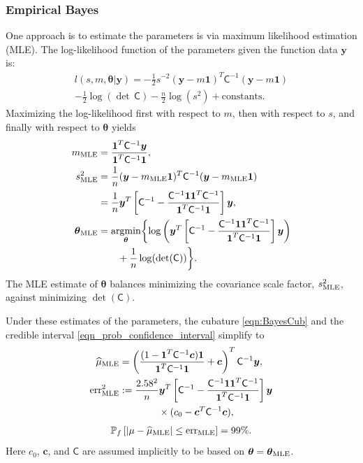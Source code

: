 \documentclass[twocolumn]{svjour3}          %
\newcommand{\bm}[1]{\boldsymbol{#1}}
\newcommand{\vtheta}{{\bm{\theta}}}
\newcommand{\vc}{\bm{c}}
\newcommand{\vy}{\bm{y}}
\newcommand{\vone}{\bm{1}}
\newcommand{\mC}{\mathsf{C}}
\newcommand{\mCInv}{{\mathsf{C}^{-1}}}
\newcommand{\hmu}{\widehat{\mu}}
\newcommand{\MLE}{\textup{MLE}}
\newcommand{\err}{\textup{err}}
\providecommand{\argmin}{\operatorname*{argmin}}
\begin{document}
\subsubsection{Empirical Bayes}  \label{sec:MLE}
One approach is to estimate the parameters is via maximum likelihood estimation (MLE).  The log-likelihood function of the parameters given the function data $\vy$ is:
\begin{multline*}
l(s,m,\vtheta | \vy)
= -\frac{1}{2} s^{-2} (\vy-m\vone)^T\mCInv(\vy-m\vone) 
\\
 - \frac{1}{2} \log(\det\, \mC) - \frac{n}{2} \log(s^2) + \text{constants.}
\end{multline*}
Maximizing the log-likelihood first with respect to $m$, then with respect to $s$, and finally with respect to $\vtheta$ yields
\begin{align}
\label{eqn_m_MLE}
m_\MLE &= \frac{\vone^T \mCInv \vy }{ \vone^T \mCInv \vone}, \\
\nonumber
s^2_{\MLE}  
&= \frac{1}{n} (\vy-m_{\MLE}\vone)^T\mCInv(\vy-m_{\MLE}\vone) 
\\
\label{eqn_s2_MLE}
&= 
\frac{1}{n}
\vy^T 
\left[ 
\mCInv - 
\frac{ \mCInv \vone \vone^T \mCInv }{\vone^T\mCInv \vone}
\right] \vy, \\
\nonumber
\vtheta_\MLE
&= \argmin_{\vtheta} \biggl \{
\log\left(\vy^T 
\left[ \mCInv - 
\frac{ \mCInv \vone \vone^T \mCInv }{\vone^T\mCInv \vone}
\right] \vy 
\right)  \\
\label{eqn:thetaMLE}
 & \qquad +  \frac{1}{n} \log(\det(\mC))
\biggr \}.
\end{align}
The MLE estimate of $\vtheta$ balances minimizing the covariance scale factor, $s^2_{\MLE}$, against minimizing  $\det(\mC)$. 

Under these estimates of the parameters, the cubature \eqref{eqn:BayesCub} and the credible interval \eqref{eqn_prob_confidence_interval} simplify to 
\begin{align} \label{eqn:cubMLE}
\hmu_\MLE  &= 
\left(
\frac{ (1 - \vone^T  \mCInv\vc )  \vone }{ \vone^T \mCInv \vone}   +  \vc 
\right)^T  \mCInv \vy, \\
\nonumber 
\err_\MLE^2 & : = \frac{2.58^2}{n}
 \vy^T \left[ \mCInv - 
\frac{ \mCInv \vone \vone^T \mCInv }{\vone^T\mCInv \vone}
\right] \vy \\
\label{eqn:errMLE}
&\qquad \qquad \times 
(c_0 - \vc^T\mC^{-1}\vc ),
\end{align}
\begin{align}
\label{eqn_prob_CI_MLE}
\mathbb{P}_f \left[
|\mu-\hmu_\MLE| \leq \err_\MLE \right]  = 99\%.
\end{align}
Here $c_0$, $\vc$, and $\mC$ are assumed implicitly to be based on $\vtheta = \vtheta_\MLE$.   
\end{document}
